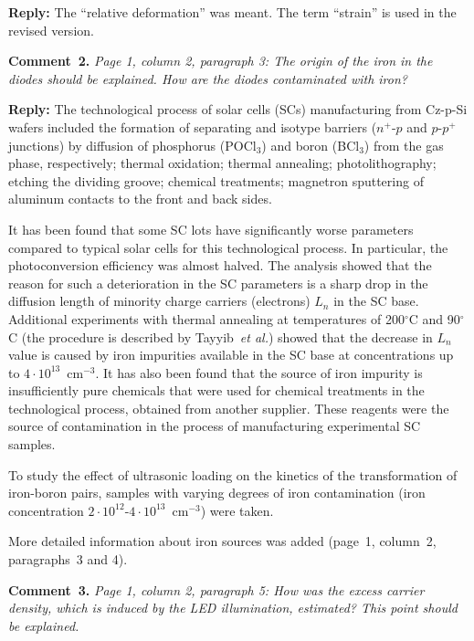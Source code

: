\documentclass[sn-mathphys]{sn-jnl}
\begin{document}
\noindent
\textcolor[rgb]{0.51,0.00,0.00}{\textbf{Reply:}}
The ``relative deformation'' was meant.
The term ``strain'' is used in the revised version.


\vspace{1cm}
\noindent
\textcolor[rgb]{0.00,0.50,1.00}{\textbf{Comment~2.}}
\emph{Page 1, column 2, paragraph 3: The origin of the iron in the diodes should be explained. How are the diodes contaminated with iron? }

\noindent
\textcolor[rgb]{0.51,0.00,0.00}{\textbf{Reply:}}
The technological process of solar cells (SCs) manufacturing from Cz-p-Si wafers included the formation of separating and isotype barriers ($n^+$-$p$ and $p$-$p^+$ junctions) by diffusion of phosphorus (POCl$_3$) and boron (BCl$_3$) from the gas phase, respectively; thermal oxidation; thermal annealing; photolithography; etching the dividing groove; chemical treatments; magnetron sputtering of aluminum contacts to the front and back sides.

It has been found that some SC lots have significantly worse parameters compared to typical solar cells for this technological process.
In particular, the photoconversion efficiency was almost halved.
The analysis showed that the reason for such a deterioration in the SC parameters is a sharp drop in the diffusion length of minority charge carriers (electrons) $L_n$ in the SC base.
Additional experiments with thermal annealing at temperatures of 200$^\circ$C and 90$^\circ$C
(the procedure is described by Tayyib~\emph{et al.}\cite{TAYYIB201221})
showed that the decrease in $L_n$ value is caused by iron impurities available in the SC base at concentrations up to $4\cdot10^{13}$~cm$^{-3}$.
It has also been found that the source of iron impurity is insufficiently pure chemicals that were used for chemical treatments in the technological process, obtained from another supplier.
These reagents were the source of contamination in the process of manufacturing experimental SC samples.

To study the effect of ultrasonic loading on the kinetics of the transformation  of iron-boron pairs, samples with varying degrees of iron contamination (iron concentration $2\cdot10^{12}$-$4\cdot10^{13}$~cm$^{-3}$) were taken.

More detailed information about iron sources was added (page~1, column~2, paragraphs~3 and 4).


\vspace{1cm}
\noindent
\textcolor[rgb]{0.00,0.50,1.00}{\textbf{Comment~3.}}
\emph{Page 1, column 2, paragraph 5: How was the excess carrier density, which is induced by the LED illumination, estimated? This point should be explained. }
\end{document}
